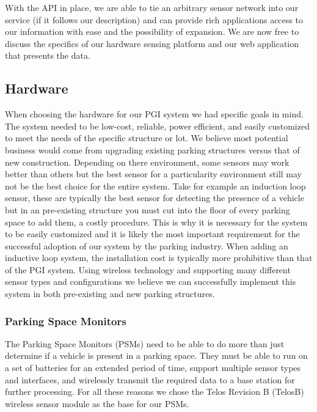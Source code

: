 \documentclass{acm_proc}
\begin{document}
With the API in place, we are able to tie an arbitrary sensor network into
our service (if it follows our description) and can provide rich
applications access to our information with ease and the possibility of
expansion.
We are now free to discuss the specifics of our hardware sensing platform
and our web application that presents the data.

\subsection{Hardware}
When choosing the hardware for our PGI system we had specific goals in
mind.  The system needed to be low-cost, reliable, power efficient, and
easily customized to meet the needs of the specific structure or lot.
We believe most potential business would come from upgrading existing
parking structures versus that of new construction.
Depending on there environment, some sensors may work better than others
but the best sensor for a particularity environment still may not be the
best choice for the entire system.
Take for example an induction loop sensor, these are typically the
best sensor for detecting the presence of a vehicle but in an pre-existing
structure you must cut into the floor of every parking space to add them, a
costly procedure.
This is why it is necessary for the system to be easily customized and it
is likely the most important requirement for the successful adoption of our
system by the parking industry.
When adding an inductive loop system, the installation cost is typically
more prohibitive than that of the PGI system.
Using wireless technology and supporting many different sensor types and
configurations we believe we can successfully implement this system in both
pre-existing and new parking structures.

\subsubsection{Parking Space Monitors}

The Parking Space Monitors (PSMs) need to be able to do more than just determine
if a vehicle is present in a parking space.
They must be able to run on a set of batteries for an extended period of
time, support multiple sensor types and interfaces, and wirelessly transmit
the required data to a base station for further processing.
For all these reasons we chose the Telos Revision B (TelosB) wireless
sensor module as the base for our PSMs.
\end{document}
